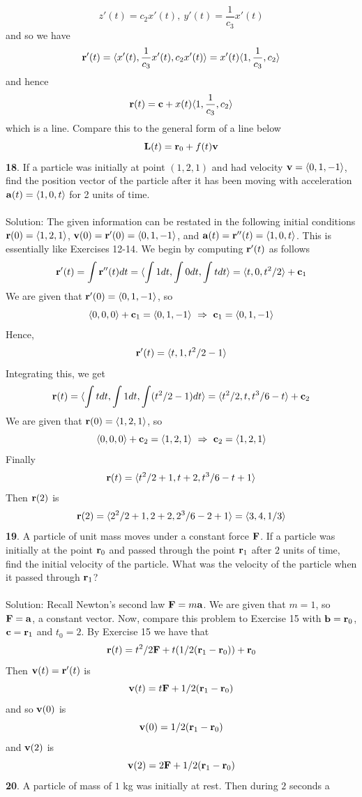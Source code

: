 \documentclass[12pt]{amsbook}
\newcommand{\la}{\langle}
\newcommand{\ra}{\rangle}
\begin{document}
$$z'(t)=c_2x'(t), \ y'(t)=\frac{1}{c_3}x'(t)$$
and so we have
$${\bf r}'(t)=\la x'(t), \frac{1}{c_3}x'(t), c_2x'(t)\ra = x'(t)\la 1,\frac{1}{c_3}, c_2 \ra $$
and hence
$${\bf r}(t)={\bf c}+x(t)\la 1, \frac{1}{c_3}, c_2\ra$$
which is a line. Compare this to the general form of a line below
$${\bf L}(t)={\bf r}_0+f(t){\bf v}$$
{\small\bf 18}. If a particle was initially at point $(1, 2, 1)$ and had velocity ${\bf v} = \la 0, 1, -1\ra$, find the position vector of the particle after it has been moving with acceleration
${\bf a}(t) = \la 1, 0, t \ra$ for 2 units of time.
\\
\\
{\sc Solution}: The given information can be restated in the following initial conditions ${\bf r}(0)=\la 1,2,1 \ra$, ${\bf v}(0)={\bf r}'(0)=\la 0,1,-1 \ra$, and ${\bf a}(t)={\bf r}''(t)=\la 1,0,t \ra$. This is essentially like Exercises 12-14. We begin by computing ${\bf r}'(t)$ as follows
$${\bf r}'(t)=\int {\bf r}''(t)dt = \la \int 1 dt, \int 0 dt, \int t dt \ra= \la t,0,t^2/2 \ra +{\bf c}_1$$
We are given that ${\bf r}'(0)=\la 0,1,-1\ra$, so
$$\la 0,0,0 \ra +{\bf c}_1=\la 0,1,-1 \ra \ \Rightarrow \ {\bf c}_1=\la 0,1,-1 \ra$$
Hence,
$${\bf r}'(t)=\la t,1,t^2/2-1 \ra$$
Integrating this, we get
$${\bf r}(t)=\la \int t dt, \int 1 dt, \int (t^2/2-1)dt \ra = \la t^2/2, t, t^3/6-t \ra +{\bf c}_2$$
We are given that ${\bf r}(0)=\la 1,2,1 \ra$, so
$$\la 0,0,0 \ra + {\bf c}_2 = \la 1,2,1 \ra \ \Rightarrow \ {\bf c}_2= \la 1,2,1 \ra$$
Finally
$${\bf r}(t)=\la t^2/2+1,t+2,t^3/6-t+1 \ra$$
Then ${\bf r}(2)$ is
$${\bf r}(2)=\la 2^2/2+1, 2+2, 2^3/6-2+1 \ra = \la 3,4,1/3 \ra$$
{\small\bf 19}. A particle of unit mass moves under a constant force ${\bf F}$. If a particle was initially at the point ${\bf r}_0$ and passed through the point ${\bf r}_1$ after $2$ units of time, find the initial velocity of the particle. What was the velocity of the
particle when it passed through ${\bf r}_1$?
\\
\\
{\sc Solution}: Recall Newton's second law ${\bf F}=m{\bf a}$. We are given that $m=1$, so ${\bf F}={\bf a}$, a constant vector. Now, compare this problem to Exercise 15 with ${\bf b}={\bf r}_0$, ${\bf c}={\bf r}_1$ and $t_0=2$. By Exercise 15 we have that
$${\bf r}(t)=t^2/2{\bf F}+t(1/2({\bf r}_1-{\bf r}_0))+{\bf r}_0$$
Then ${\bf v}(t)={\bf r}'(t)$ is 
$${\bf v}(t)=t{\bf F}+1/2({\bf r}_1-{\bf r}_0)$$
and so ${\bf v}(0)$ is
$${\bf v}(0)=1/2({\bf r}_1-{\bf r}_0)$$
and ${\bf v}(2)$ is 
$${\bf v}(2)=2{\bf F}+1/2({\bf r}_1-{\bf r}_0)$$
{\small\bf 20}. A particle of mass of $1$ kg was initially at rest. Then during $2$ seconds a
\end{document}
